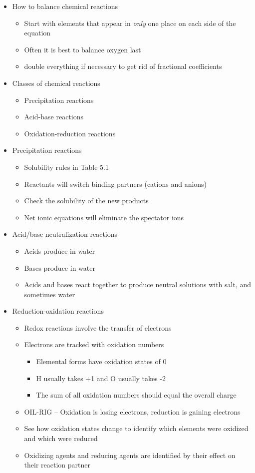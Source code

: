 \documentclass[12pt, letterpaper]{memoir}
\begin{document}
	\begin{itemize}
		\item How to balance chemical reactions
		\begin{itemize}
			\item Start with elements that appear in \emph{only} one place on each side of the equation
			\item Often it is best to balance oxygen last
			\item double everything if necessary to get rid of fractional coefficients
		\end{itemize}
		\item Classes of chemical reactions
		\begin{itemize}
			\item Precipitation reactions
			\item Acid-base reactions
			\item Oxidation-reduction reactions
		\end{itemize}
		\item Precipitation reactions
		\begin{itemize}
			\item Solubility rules in Table 5.1
			\item Reactants will switch binding partners (cations and anions)
			\item Check the solubility of the new products
			\item Net ionic equations will eliminate the spectator ions
		\end{itemize}
		\item Acid/base neutralization reactions
		\begin{itemize}
			\item Acids produce  in water
			\item Bases produce  in water
			\item Acids and bases react together to produce neutral solutions with salt, and sometimes water
		\end{itemize}
		\item Reduction-oxidation reactions
		\begin{itemize}
			\item Redox reactions involve the transfer of electrons
			\item Electrons are tracked with oxidation numbers
			\begin{itemize}
				\item Elemental forms have oxidation states of 0
				\item H usually takes +1 and O usually takes -2
				\item The sum of all oxidation numbers should equal the overall charge
			\end{itemize}
			\item OIL-RIG -- Oxidation is losing electrons, reduction is gaining electrons
			\item See how oxidation states change to identify which elements were oxidized and which were reduced
			\item Oxidizing agents and reducing agents are identified by their effect on their reaction partner
		\end{itemize}
	\end{itemize}
\end{document}
